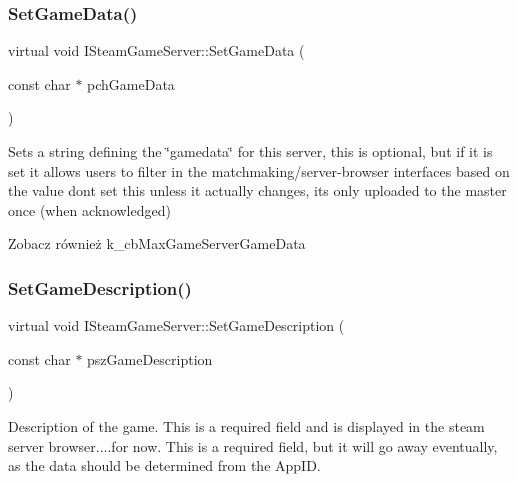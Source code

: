 \subsubsection{\texorpdfstring{Set\+Game\+Data()}{SetGameData()}}
{\footnotesize\ttfamily virtual void I\+Steam\+Game\+Server\+::\+Set\+Game\+Data (\begin{DoxyParamCaption}\item[{const char $\ast$}]{pch\+Game\+Data }\end{DoxyParamCaption})\hspace{0.3cm}{\ttfamily [pure virtual]}}

Sets a string defining the \char`\"{}gamedata\char`\"{} for this server, this is optional, but if it is set it allows users to filter in the matchmaking/server-\/browser interfaces based on the value don\textquotesingle{}t set this unless it actually changes, its only uploaded to the master once (when acknowledged)

\begin{DoxySeeAlso}{Zobacz również}
k\+\_\+cb\+Max\+Game\+Server\+Game\+Data 
\end{DoxySeeAlso}
\mbox{\label{class_i_steam_game_server_a475be416147c6fe13bb3532c829650f2}} 
\subsubsection{\texorpdfstring{Set\+Game\+Description()}{SetGameDescription()}}
{\footnotesize\ttfamily virtual void I\+Steam\+Game\+Server\+::\+Set\+Game\+Description (\begin{DoxyParamCaption}\item[{const char $\ast$}]{psz\+Game\+Description }\end{DoxyParamCaption})\hspace{0.3cm}{\ttfamily [pure virtual]}}

Description of the game. This is a required field and is displayed in the steam server browser....for now. This is a required field, but it will go away eventually, as the data should be determined from the App\+ID. \mbox{\label{class_i_steam_game_server_a2e12f2c66ae3f42bdc23a6e2a3f65697}} 

